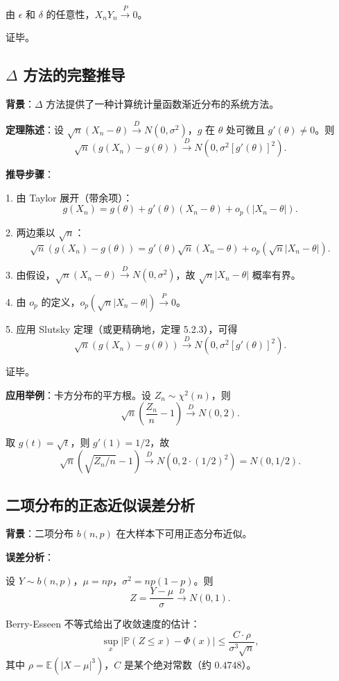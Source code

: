 由 $\epsilon$ 和 $\delta$ 的任意性，$X_n Y_n \xrightarrow{P} 0$。

证毕。

\subsection{$\Delta$ 方法的完整推导}\label{sec:delta-method-proof}

\textbf{背景}：$\Delta$ 方法提供了一种计算统计量函数渐近分布的系统方法。

\textbf{定理陈述}：设 $\sqrt{n}(X_n - \theta) \xrightarrow{D} N(0, \sigma^2)$，$g$ 在 $\theta$ 处可微且 $g'(\theta) \neq 0$。则
\[
\sqrt{n}(g(X_n) - g(\theta)) \xrightarrow{D} N(0, \sigma^2 [g'(\theta)]^2).
\]

\textbf{推导步骤}：

1. 由 Taylor 展开（带余项）：
\[
g(X_n) = g(\theta) + g'(\theta)(X_n - \theta) + o_p(|X_n - \theta|).
\]

2. 两边乘以 $\sqrt{n}$：
\[
\sqrt{n}(g(X_n) - g(\theta)) = g'(\theta)\sqrt{n}(X_n - \theta) + o_p(\sqrt{n}|X_n - \theta|).
\]

3. 由假设，$\sqrt{n}(X_n - \theta) \xrightarrow{D} N(0, \sigma^2)$，故 ${ \sqrt{n}|X_n - \theta| }$ 概率有界。

4. 由 $o_p$ 的定义，$o_p(\sqrt{n}|X_n - \theta|) \xrightarrow{P} 0$。

5. 应用 Slutsky 定理（或更精确地，定理 5.2.3），可得
\[
\sqrt{n}(g(X_n) - g(\theta)) \xrightarrow{D} N(0, \sigma^2 [g'(\theta)]^2).
\]

证毕。

\textbf{应用举例}：卡方分布的平方根。设 $Z_n \sim \chi^2(n)$，则
\[
\sqrt{n}\left(\frac{Z_n}{n} - 1\right) \xrightarrow{D} N(0, 2).
\]

取 $g(t) = \sqrt{t}$，则 $g'(1) = 1/2$，故
\[
\sqrt{n}(\sqrt{Z_n/n} - 1) \xrightarrow{D} N(0, 2 \cdot (1/2)^2) = N(0, 1/2).
\]

\subsection{二项分布的正态近似误差分析}\label{sec:binomial-poisson-approximation}

\textbf{背景}：二项分布 $b(n,p)$ 在大样本下可用正态分布近似。

\textbf{误差分析}：

设 $Y \sim b(n,p)$，$\mu = np$，$\sigma^2 = np(1-p)$。则
\[
Z = \frac{Y - \mu}{\sigma} \xrightarrow{D} N(0,1).
\]

Berry-Esseen 不等式给出了收敛速度的估计：
\[
\sup_x |\mathbb{P}(Z \leq x) - \Phi(x)| \leq \frac{C \cdot \rho}{\sigma^3\sqrt{n}},
\]
其中 $\rho = \mathbb{E}(|X - \mu|^3)$，$C$ 是某个绝对常数（约 $0.4748$）。

